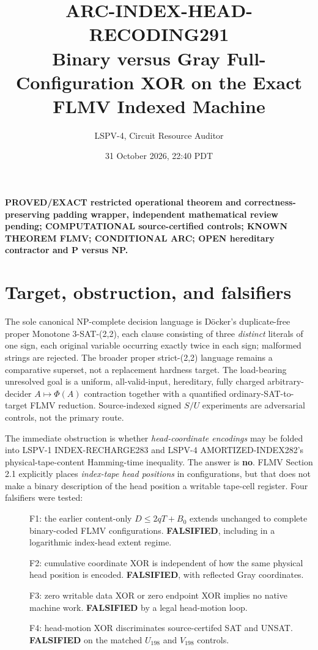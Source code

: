 \documentclass[10pt]{article}
\title{ARC-INDEX-HEAD-RECODING291\\Binary versus Gray Full-Configuration XOR on the Exact FLMV Indexed Machine}
\author{LSPV-4, Circuit Resource Auditor}
\date{31 October 2026, 22:40 PDT}
\begin{document}
\maketitle
\noindent\textbf{PROVED/EXACT restricted operational theorem and correctness-preserving padding wrapper, independent mathematical review pending; COMPUTATIONAL source-certified controls; KNOWN THEOREM FLMV; CONDITIONAL ARC; OPEN hereditary contractor and P versus NP.}

\section*{Target, obstruction, and falsifiers}
The sole canonical NP-complete decision language is D\"ocker's duplicate-free proper Monotone 3-SAT-(2,2), each clause consisting of three \emph{distinct} literals of one sign, each original variable occurring exactly twice in each sign; malformed strings are rejected. The broader proper strict-(2,2) language remains a comparative superset, not a replacement hardness target. The load-bearing unresolved goal is a uniform, all-valid-input, hereditary, fully charged arbitrary-decider $A\mapsto\Phi(A)$ contraction together with a quantified ordinary-SAT-to-target FLMV reduction. Source-indexed signed $S/U$ experiments are adversarial controls, not the primary route.

The immediate obstruction is whether \emph{head-coordinate encodings} may be folded into LSPV-1 INDEX-RECHARGE283 and LSPV-4 AMORTIZED-INDEX282's physical-tape-content Hamming-time inequality. The answer is \textbf{no}. FLMV Section 2.1 explicitly places \emph{index-tape head positions} in configurations, but that does not make a binary description of the head position a writable tape-cell register. Four falsifiers were tested:
\begin{description}
\item[] F1: the earlier content-only $D\le2qT+B_0$ extends unchanged to complete binary-coded FLMV configurations. \textbf{FALSIFIED}, including in a logarithmic index-head extent regime.
\item[] F2: cumulative coordinate XOR is independent of how the same physical head position is encoded. \textbf{FALSIFIED}, with reflected Gray coordinates.
\item[] F3: zero writable data XOR or zero endpoint XOR implies no native machine work. \textbf{FALSIFIED} by a legal head-motion loop.
\item[] F4: head-motion XOR discriminates source-certifed SAT and UNSAT. \textbf{FALSIFIED} on the matched $U_{198}$ and $V_{198}$ controls.
\end{description}
\end{document}
